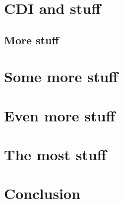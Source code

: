 \documentclass[12pt]{ociamthesis}\usepackage[]{graphicx}\usepackage[]{color}
\begin{document}
\chapter{CDI and stuff}

\lipsum

\section{More stuff}

\lipsum

\chapter{Some more stuff}

\lipsum

\chapter{Even more stuff}

\lipsum

\chapter{The most stuff}

\lipsum

\chapter{Conclusion}




\end{document}
